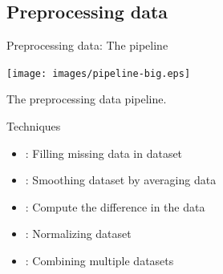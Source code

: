 \documentclass[compress, mathserif, fleqn, 10pt]{beamer}
\begin{document}
	\subsection{Preprocessing data}
	\begin{frame}{Preprocessing data: The pipeline}
		\centerline{\texttt{[image: images/pipeline-big.eps]}}
		\centerline{The preprocessing data pipeline.}
		\begin{block}{Techniques}
			\begin{itemize}
				\item {}: Filling missing data in dataset
				
				\item {}: Smoothing dataset by averaging data
				
				\item {}: Compute the difference in the data
				
				\item {}: Normalizing dataset
				
				\item {}: Combining multiple datasets
			\end{itemize}
		\end{block}
	\end{frame}
	
\end{document}
